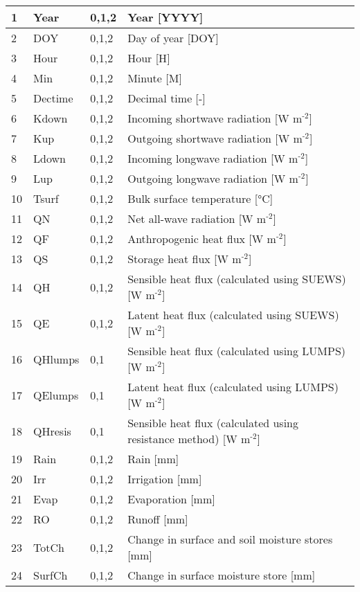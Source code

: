 \documentclass[letterpaper,10pt,english]{sphinxmanual}
\begin{document}
\begin{savenotes}
\begin{longtable}{|l|l|l|l|}
1
&
Year
&
0,1,2
&
Year {[}YYYY{]}
\\
\hline
2
&
DOY
&
0,1,2
&
Day of year {[}DOY{]}
\\
\hline
3
&
Hour
&
0,1,2
&
Hour {[}H{]}
\\
\hline
4
&
Min
&
0,1,2
&
Minute {[}M{]}
\\
\hline
5
&
Dectime
&
0,1,2
&
Decimal time {[}-{]}
\\
\hline
6
&
Kdown
&
0,1,2
&
Incoming shortwave radiation {[}W m$^{\text{-2}}${]}
\\
\hline
7
&
Kup
&
0,1,2
&
Outgoing shortwave radiation {[}W m$^{\text{-2}}${]}
\\
\hline
8
&
Ldown
&
0,1,2
&
Incoming longwave radiation {[}W m$^{\text{-2}}${]}
\\
\hline
9
&
Lup
&
0,1,2
&
Outgoing longwave radiation {[}W m$^{\text{-2}}${]}
\\
\hline
10
&
Tsurf
&
0,1,2
&
Bulk surface temperature {[}°C{]}
\\
\hline
11
&
QN
&
0,1,2
&
Net all-wave radiation {[}W m$^{\text{-2}}${]}
\\
\hline
12
&
QF
&
0,1,2
&
Anthropogenic heat flux {[}W m$^{\text{-2}}${]}
\\
\hline
13
&
QS
&
0,1,2
&
Storage heat flux {[}W m$^{\text{-2}}${]}
\\
\hline
14
&
QH
&
0,1,2
&
Sensible heat flux (calculated using SUEWS) {[}W m$^{\text{-2}}${]}
\\
\hline
15
&
QE
&
0,1,2
&
Latent heat flux (calculated using SUEWS) {[}W m$^{\text{-2}}${]}
\\
\hline
16
&
QHlumps
&
0,1
&
Sensible heat flux (calculated using LUMPS) {[}W m$^{\text{-2}}${]}
\\
\hline
17
&
QElumps
&
0,1
&
Latent heat flux (calculated using LUMPS) {[}W m$^{\text{-2}}${]}
\\
\hline
18
&
QHresis
&
0,1
&
Sensible heat flux (calculated using resistance method) {[}W m$^{\text{-2}}${]}
\\
\hline
19
&
Rain
&
0,1,2
&
Rain {[}mm{]}
\\
\hline
20
&
Irr
&
0,1,2
&
Irrigation {[}mm{]}
\\
\hline
21
&
Evap
&
0,1,2
&
Evaporation {[}mm{]}
\\
\hline
22
&
RO
&
0,1,2
&
Runoff {[}mm{]}
\\
\hline
23
&
TotCh
&
0,1,2
&
Change in surface and soil moisture stores {[}mm{]}
\\
\hline
24
&
SurfCh
&
0,1,2
&
Change in surface moisture store {[}mm{]}
\\

\end{longtable}
\end{savenotes}
\end{document}
